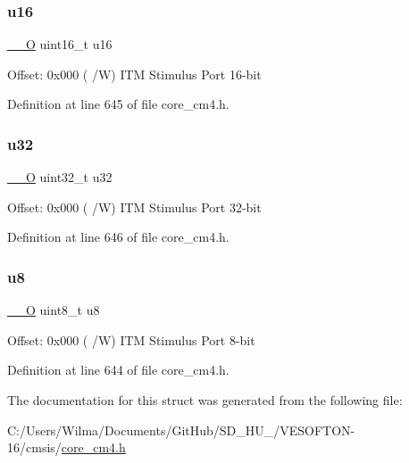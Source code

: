 \subsubsection{\texorpdfstring{u16}{u16}}
{\footnotesize\ttfamily \hyperlink{group___c_m_s_i_s__core__definitions_ga7e25d9380f9ef903923964322e71f2f6}{\+\_\+\+\_\+O} uint16\+\_\+t u16}

Offset\+: 0x000 ( /W) I\+TM Stimulus Port 16-\/bit 

Definition at line 645 of file core\+\_\+cm4.\+h.

\mbox{\label{struct_i_t_m___type_acaf6d0e14a3d4b541c624913b4a1931e}} 
\subsubsection{\texorpdfstring{u32}{u32}}
{\footnotesize\ttfamily \hyperlink{group___c_m_s_i_s__core__definitions_ga7e25d9380f9ef903923964322e71f2f6}{\+\_\+\+\_\+O} uint32\+\_\+t u32}

Offset\+: 0x000 ( /W) I\+TM Stimulus Port 32-\/bit 

Definition at line 646 of file core\+\_\+cm4.\+h.

\mbox{\label{struct_i_t_m___type_a0374c0b98ab9de6f71fabff7412df832}} 
\subsubsection{\texorpdfstring{u8}{u8}}
{\footnotesize\ttfamily \hyperlink{group___c_m_s_i_s__core__definitions_ga7e25d9380f9ef903923964322e71f2f6}{\+\_\+\+\_\+O} uint8\+\_\+t u8}

Offset\+: 0x000 ( /W) I\+TM Stimulus Port 8-\/bit 

Definition at line 644 of file core\+\_\+cm4.\+h.



The documentation for this struct was generated from the following file\+:\begin{DoxyCompactItemize}
\item 
C\+:/\+Users/\+Wilma/\+Documents/\+Git\+Hub/\+S\+D\+\_\+\+H\+U\+\_/\+V\+E\+S\+O\+F\+T\+O\+N-\/16/cmsis/\hyperlink{core__cm4_8h}{core\+\_\+cm4.\+h}\end{DoxyCompactItemize}
